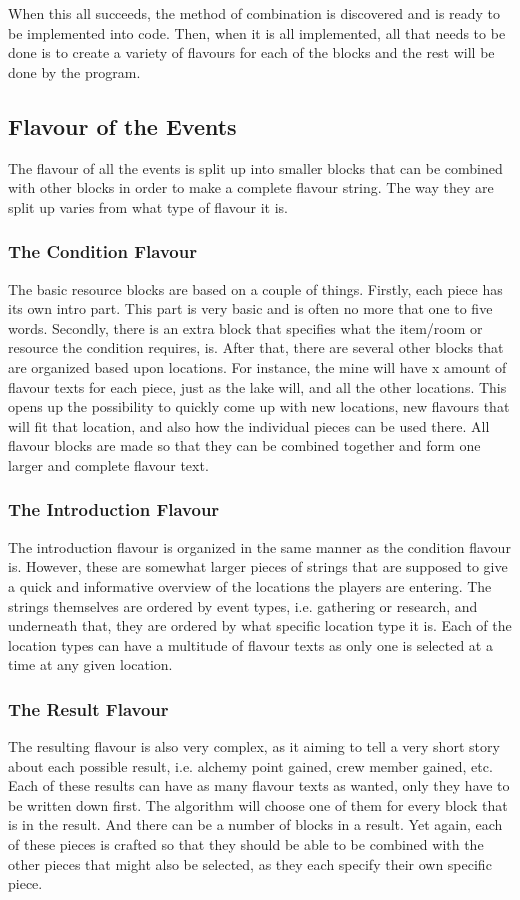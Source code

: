 When this all succeeds, the method of combination is discovered and is ready to be implemented into code. Then, when it is all implemented, all that needs to be done is to create a variety of flavours for each of the blocks and the rest will be done by the program.
\subsection{Flavour of the Events}
\label{sec:flav}

The flavour of all the events is split up into smaller blocks that can be combined with other blocks in order to make a complete flavour string. The way they are split up varies from what type of flavour it is.
\subsubsection{The Condition Flavour}
The basic resource blocks are based on a couple of things. Firstly, each piece has its own intro part. This part is very basic and is often no more that one to five words. Secondly, there is an extra block that specifies what the item/room or resource the condition requires, is. After that, there are several other blocks that are organized based upon locations. For instance, the mine will have x amount of flavour texts for each piece, just as the lake will, and all the other locations. This opens up the possibility to quickly come up with new locations, new flavours that will fit that location, and also how the individual pieces can be used there. All flavour blocks are made so that they can be combined together and form one larger and complete flavour text.
\subsubsection{The Introduction Flavour}
The introduction flavour is organized in the same manner as the condition flavour is. However, these are somewhat larger pieces of strings that are supposed to give a quick and informative overview of the locations the players are entering. The strings themselves are ordered by event types, i.e. gathering or research, and underneath that, they are ordered by what specific location type it is. Each of the location types can have a multitude of flavour texts as only one is selected at a time at any given location.
\subsubsection{The Result Flavour}
The resulting flavour is also very complex, as it aiming to tell a very short story about each possible result, i.e. alchemy point gained, crew member gained, etc.
Each of these results can have as many flavour texts as wanted, only they have to be written down first. The algorithm will choose one of them for every block that is in the result. And there can be a number of blocks in a result. Yet again, each of these pieces is crafted so that they should be able to be combined with the other pieces that might also be selected, as they each specify their own specific piece.
